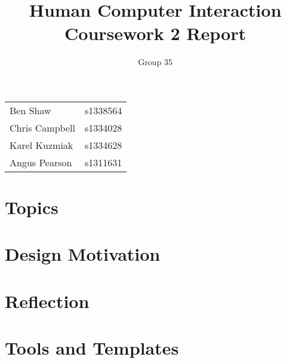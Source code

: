 \documentclass[a4paper, notoc]{tufte-handout}
\title{Human Computer Interaction\\ Coursework 2 Report}
\author{Group 35}
\begin{document}
\maketitle %
\vspace{1em}
\noindent
\begin{tabular}{l r}
  Ben Shaw       & s1338564\\
  Chris Campbell & s1334028\\
  Karel Kuzmiak  & s1334628\\
  Angus Pearson  & s1311631\\
\end{tabular}



\section{Topics}


\section{Design Motivation}


\section{Reflection}



\section{Tools and Templates}

\end{document}
